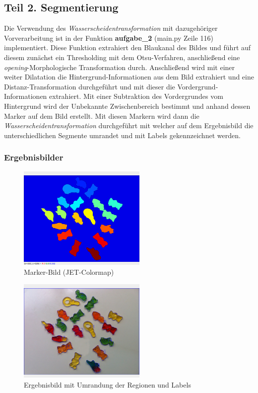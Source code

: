 \documentclass[12pt]{article}
\begin{document}
\newpage

\subsection*{Teil 2. Segmentierung}
Die Verwendung des \textit{Wasserscheidentransformation} mit dazugehöriger Vorverarbeitung ist in der Funktion \textbf{aufgabe\_2} (main.py Zeile 116) implementiert.
Diese Funktion extrahiert den Blaukanal des Bildes und führt auf diesem zunächst ein Thresholding mit dem Otsu-Verfahren, anschließend eine \textit{opening}-Morphologische Transformation durch.
Anschließend wird mit einer weiter Dilatation die Hintergrund-Informationen aus dem Bild extrahiert und eine Distanz-Transformation durchgeführt und mit dieser die Vordergrund-Informationen extrahiert. Mit einer Subtraktion des Vordergrundes vom Hintergrund wird der Unbekannte Zwischenbereich bestimmt und anhand dessen Marker auf dem Bild erstellt. Mit diesen Markern wird dann die \textit{Wasserscheidentransformation} durchgeführt mit welcher auf dem Ergebnisbild die unterschiedlichen Segmente umrandet und mit Labels gekennzeichnet werden.

\subsubsection*{Ergebnisbilder}
\begin{figure}[H]
  \centering
  \includegraphics[width=0.55\textwidth, keepaspectratio]{marker.png}\\
  Marker-Bild (JET-Colormap)
\end{figure}
\begin{figure}[H]
  \centering
  \includegraphics[width=0.55\textwidth, keepaspectratio]{outline.png}\\
  Ergebnisbild mit Umrandung der Regionen und Labels
\end{figure}
\end{document}
